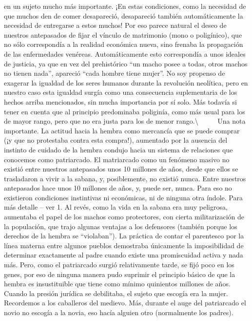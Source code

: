 en un sujeto mucho más importante. ¡En estas condiciones, como la
necesidad de que muchos den de comer desapareció, desapareció también
automáticamente la necesidad de entregarse a estos muchos! Por eso
parece natural el deseo de nuestros antepasados de fijar el vínculo de
matrimonio (mono o poligínico), que no sólo correspondía a la realidad
económica nueva, sino frenaba la propagación de las enfermedades
venéreas. Automáticamente esto correspondía a unos ideales de justicia,
ya que en vez del prehistórico ``un macho posee a todas, otros machos no
tienen nada'', apareció ``cada hombre tiene mujer''. No soy propenso de
exagerar la igualdad de los seres humanos durante la revolución
neolítica, pero en nuestro caso esta igualdad surgía como una
consecuencia suplementaria de los hechos arriba mencionados, sin mucha
importancia por sí solo. Más todavía si tener en cuenta que al principio
predominaba poliginía, como más usual para los de mayor rango, pero que
no era justa para los de menor rango.\textbackslash{} ~ ~ ~ Una nota
importante. La actitud hacia la hembra como mercancía que se puede
comprar (¡y que no protestaba contra esta compra!), aumentado por la
ausencia del instinto de cuidado de la hembra condujo hacia un sistema
de relaciones que conocemos como patriarcado. El matriarcado como un
fenómeno masivo no existió entre nuestros antepasados unos 10 millones
de años, desde que ellos se trasladaron a vivir a la sabana, y,
posiblemente, no existió nunca. Entre nuestros antepasados hace unos 10
millones de años, y, puede ser, nunca. Para eso no existieron
condiciones instintivas ni económicas, ni de ninguna otra índole. Para
más detalle -- ver 1. Al revés, como la vida en la sabana era muy
peligrosa, aumentaba el papel de los machos como protectores, con cierta
militarización de la populación, que trajo algunas ventajas a los
defensores (también porque los derechos de la hembra se ``violaban'').
La práctica de contar el parentesco por la línea materna entre algunos
pueblos demostraba únicamente la imposibilidad de determinar exactamente
al padre cuando existe una promiscuidad activa y nada más. Pero, como el
patriarcado surgió relativamente tarde, se fijó poco en los genes, por
eso de ninguna manera pudo suprimir el principio básico de que la hembra
es insustituible que tiene como mínimo quinientos millones de años.
Cuando la presión jurídica se debilitaba, el sujeto que escogía era la
mujer. Recordemos a los caballeros del medievo. Más, durante el auge del
patriarcado el novio no escogía a la novia, eso hacía alguien otro
(normalmente los padres).

